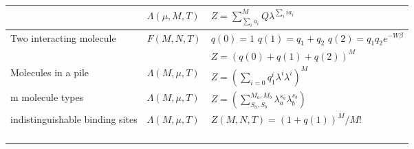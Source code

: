 \documentclass[12pt, oneside]{article}   	%
\begin{document}
\begin{table}[]
\begin{tabular}{lll}
\multicolumn{1}{|l|}{}                                                        & \multicolumn{1}{l|}{$\Lambda(\mu, M, T)$} & \multicolumn{1}{l|}{$Z = \sum_{\sum_i a_i}^M Q \lambda^{\sum_i i a_i}$}                                      \\ \hline
\multicolumn{1}{|l|}{\multirow{2}{*}{Two interacting molecule }} & \multicolumn{1}{l|}{$F(M,N,T)$}           & \multicolumn{1}{l|}{$q(0) = 1 $ $q(1) = q_1 + q_2$ $q(2) = q_1q_2 e^{- W \beta}$}      \\ \cline{2-3} 
\multicolumn{1}{|l|}{}                                                        & \multicolumn{1}{l|}{}                     & \multicolumn{1}{l|}{$Z = (q(0) + q(1) + q(2))^M$}                                                            \\ \hline
\multicolumn{1}{|l|}{Molecules in a pile}                                     & \multicolumn{1}{l|}{$\Lambda(M, \mu,T)$}  & \multicolumn{1}{l|}{$Z = ( \sum_{i =0 } q_1^i \lambda^i \lambda^i)^M $}                                      \\ \hline
\multicolumn{1}{|l|}{m molecule types}                                        & \multicolumn{1}{l|}{$\Lambda(M, \mu,T)$}  & \multicolumn{1}{l|}{$Z = (\sum_{S_a,S_b} ^{M_a, M_b} \lambda_a^{s_a} \lambda_b^{s_b})$}                      \\ \hline
\multicolumn{1}{|l|}{indistinguishable binding sites}        & \multicolumn{1}{l|}{$\Lambda(M, \mu,T)$}  & \multicolumn{1}{l|}{$Z(M , N, T) = (1 + q(1))^M / M!$}                                                       \\ \hline
                                                                              &                                           &                                                                                                              \\
                                                                              &                                           &                                                                                                              \\
                                                                              &                                           &                                                                                                              \\
                                                                              &                                           &                                                                                                             
\end{tabular}
\end{table}
\end{document}

